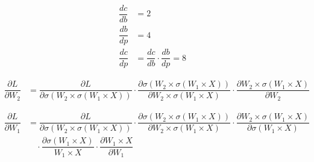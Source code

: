 \documentclass[12pt]{article}
\begin{document}
\begin{align*}
\dfrac{dc}{db} &= 2 \\
\dfrac{db}{dp} &= 4 \\
\dfrac{dc}{dp} &= \dfrac{dc}{db} \cdot \dfrac{db}{dp} = 8
\end{align*}


\begin{align*}
\dfrac{\partial L}{\partial W_2} &= \dfrac{\partial L}{\partial \sigma(W_2 \times \sigma(W_1 \times X))}
\cdot \dfrac{\partial \sigma(W_2 \times \sigma(W_1 \times X))}{\partial W_2 \times \sigma(W_1 \times X)}
\cdot \dfrac{\partial W_2 \times \sigma(W_1 \times X)}{\partial W_2}
\end{align*}

\begin{align*}
\dfrac{\partial L}{\partial W_1} &= \dfrac{\partial L}{\partial \sigma(W_2 \times \sigma(W_1 \times X))}
\cdot \dfrac{\partial \sigma(W_2 \times \sigma(W_1 \times X))}{\partial W_2 \times \sigma(W_1 \times X)}
\cdot \dfrac{\partial W_2 \times \sigma(W_1 \times X)}{\partial \sigma(W_1 \times X)}\\[1em]
&\quad \cdot \dfrac{\partial \sigma(W_1 \times X)}{W_1 \times X}
\cdot \dfrac{\partial W_1 \times X}{\partial W_1}
\end{align*}
\end{document}
